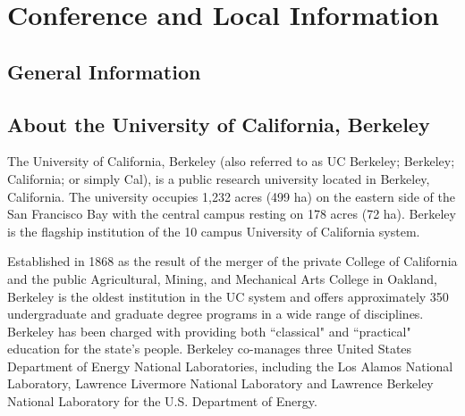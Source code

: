 \chapter{Conference and Local Information}

\setlength\fboxsep{0pt}
\setlength\fboxrule{0.5pt}



\vspace{-1.0cm}
 \section{General Information}


\section*{About the University of California, Berkeley}

The University of California, Berkeley (also referred to as UC Berkeley; Berkeley; California; or simply Cal), is a public research university located in Berkeley, California. The university occupies 1,232 acres (499 ha) on the eastern side of the San Francisco Bay with the central campus resting on 178 acres (72 ha). Berkeley is the flagship institution of the 10 campus University of California system.

Established in 1868 as the result of the merger of the private College of California and the public Agricultural, Mining, and Mechanical Arts College in Oakland, Berkeley is the oldest institution in the UC system and offers approximately 350 undergraduate and graduate degree programs in a wide range of disciplines. Berkeley has been charged with providing both ``classical" and ``practical" education for the state's people. Berkeley co-manages three United States Department of Energy National Laboratories, including the Los Alamos National Laboratory, Lawrence Livermore National Laboratory and Lawrence Berkeley National Laboratory for the U.S. Department of Energy.

